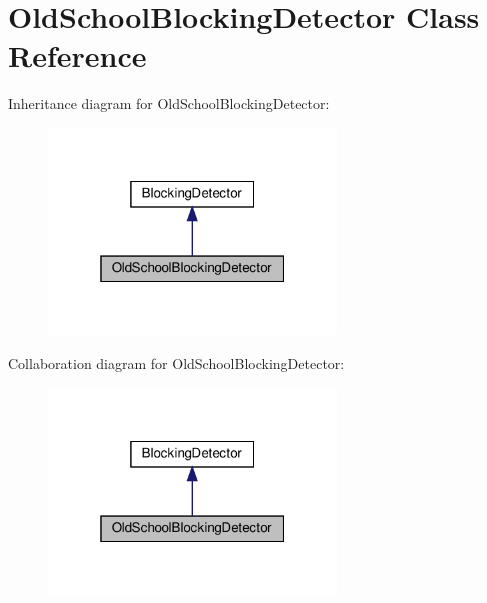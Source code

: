 \hypertarget{classOldSchoolBlockingDetector}{}\section{Old\+School\+Blocking\+Detector Class Reference}
\label{classOldSchoolBlockingDetector}


Inheritance diagram for Old\+School\+Blocking\+Detector\+:
\nopagebreak
\begin{figure}[H]
\begin{center}
\leavevmode
\includegraphics[width=217pt]{classOldSchoolBlockingDetector__inherit__graph}
\end{center}
\end{figure}


Collaboration diagram for Old\+School\+Blocking\+Detector\+:
\nopagebreak
\begin{figure}[H]
\begin{center}
\leavevmode
\includegraphics[width=217pt]{classOldSchoolBlockingDetector__coll__graph}
\end{center}
\end{figure}
